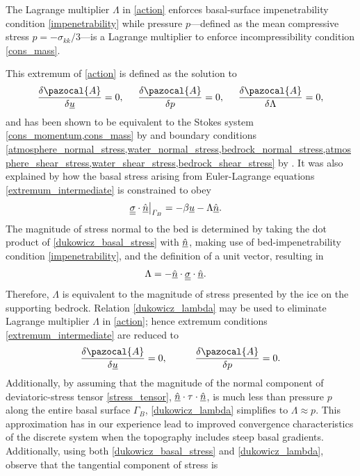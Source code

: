The Lagrange multiplier $\Lambda$ in \cref{action} enforces basal-surface impenetrability condition \cref{impenetrability} while pressure $p$---defined as the mean compressive stress $p = -\sigma_{kk} / 3$---is a Lagrange multiplier to enforce incompressibility condition \cref{cons_mass}.

This extremum of \cref{action} is defined as the solution to
\begin{align}
  \label{extremum_intermediate}
  \frac{\delta \pazocal{A}}{\delta \rankone{u}} = 0, \hspace{5mm} \frac{\delta \pazocal{A}}{\delta p} = 0, \hspace{5mm} \frac{\delta \pazocal{A}}{\delta \Lambda} = 0,
\end{align}
and has been shown to be equivalent to the Stokes system \cref{cons_momentum,cons_mass} by \citet{dukowicz_2010} and boundary conditions \cref{atmosphere_normal_stress,water_normal_stress,bedrock_normal_stress,atmosphere_shear_stress,water_shear_stress,bedrock_shear_stress} by \citet{dukowicz_2011}.
It was also explained by \citet{dukowicz_2011} how the basal stress arising from Euler-Lagrange equations \cref{extremum_intermediate} is constrained to obey
\begin{align}
  \label{dukowicz_basal_stress}
  \underline{\underline{\sigma}} \cdot \underline{\hat{n}} \big|_{\varGamma_B} &= - \beta \underline{u} - \Lambda \underline{\hat{n}}.
\end{align}
The magnitude of stress normal to the bed is determined by taking the dot product of \cref{dukowicz_basal_stress} with $\underline{\hat{n}}$, making use of bed-impenetrability condition \cref{impenetrability}, and the definition of a unit vector, resulting in
\begin{align}
  \label{dukowicz_lambda}
  \Lambda &= - \underline{\hat{n}} \cdot \underline{\underline{\sigma}} \cdot \underline{\hat{n}}.
\end{align}
Therefore, $\Lambda$ is equivalent to the magnitude of stress presented by the ice on the supporting bedrock.  Relation \cref{dukowicz_lambda} may be used to eliminate Lagrange multiplier $\Lambda$ in \cref{action}; hence extremum conditions \cref{extremum_intermediate} are reduced to
\begin{align}
  \label{extremum}
  \frac{\delta \pazocal{A}}{\delta \rankone{u}} = 0, \hspace{10mm} \frac{\delta \pazocal{A}}{\delta p} = 0.
\end{align}
Additionally, by assuming that the magnitude of the normal component of deviatoric-stress tensor \cref{stress_tensor}, $\underline{\hat{n}} \cdot \tau \cdot \underline{\hat{n}}$, is much less than pressure $p$ along the entire basal surface $\Gamma_B$, \cref{dukowicz_lambda} simplifies to $\Lambda \approx p$.  This approximation has in our experience lead to improved convergence characteristics of the discrete system when the topography includes steep basal gradients.  Additionally, using both \cref{dukowicz_basal_stress} and \cref{dukowicz_lambda}, observe that the tangential component of stress is
